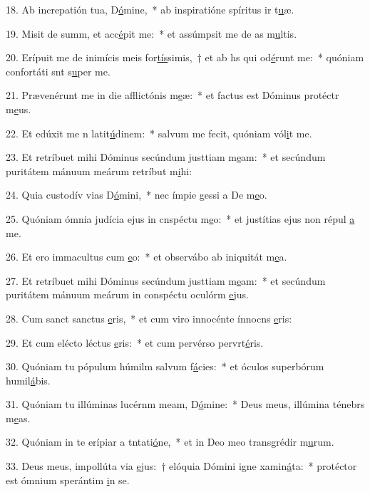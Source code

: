 18. Ab increpatión tua, D\uline{ó}mine,~* ab inspiratióne spíritus ir t\uline{u}æ.\par 
19. Misit de summ, et acc\uline{é}pit me:~* et assúmpsit me de as m\uline{u}ltis.\par 
20. Erípuit me de inimícis meis for\uline{tís}simis,~† et ab hs qui od\uline{é}runt me:~* quóniam confortáti snt s\uline{u}per me.\par 
21. Prævenérunt me in die afflictónis m\uline{e}æ:~* et factus est Dóminus protéctr m\uline{e}us.\par 
22. Et edúxit me n latit\uline{ú}dinem:~* salvum me fecit, quóniam vól\uline{i}t me.\par 
23. Et retríbuet mihi Dóminus secúndum justtiam m\uline{e}am:~* et secúndum puritátem mánuum meárum retríbut m\uline{i}hi:\par 
24. Quia custodív vias D\uline{ó}mini,~* nec ímpie gessi a De m\uline{e}o.\par 
25. Quóniam ómnia judícia ejus in cnspéctu m\uline{e}o:~* et justítias ejus non répul \uline{a} me.\par 
26. Et ero immacultus cum \uline{e}o:~* et observábo ab iniquitát m\uline{e}a.\par 
27. Et retríbuet mihi Dóminus secúndum justtiam m\uline{e}am:~* et secúndum puritátem mánuum meárum in conspéctu oculórm \uline{e}jus.\par 
28. Cum sanct sanctus \uline{e}ris,~* et cum viro innocénte ínnocns \uline{e}ris:\par 
29. Et cum elécto léctus \uline{e}ris:~* et cum pervérso pervrt\uline{é}ris.\par 
30. Quóniam tu pópulum húmilm salvum f\uline{á}cies:~* et óculos superbórum humil\uline{á}bis.\par 
31. Quóniam tu illúminas lucérnm meam, D\uline{ó}mine:~* Deus meus, illúmina ténebrs m\uline{e}as.\par 
32. Quóniam in te erípiar a tntati\uline{ó}ne,~* et in Deo meo transgrédir m\uline{u}rum.\par 
33. Deus meus, impollúta via \uline{e}jus:~† elóquia Dómini igne xamin\uline{á}ta:~* protéctor est ómnium sperántim \uline{i}n se.\par 
